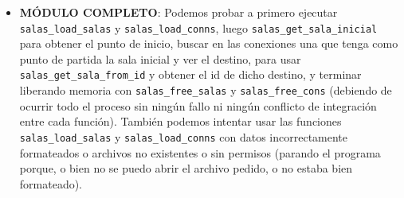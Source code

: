 \begin{itemize}
\begin{itemize}
			\\ \item \textbf{MÓDULO COMPLETO}: Podemos probar a primero ejecutar \verb|salas_load_salas| y \verb|salas_load_conns|, luego \verb|salas_get_sala_inicial| para obtener el punto de inicio, buscar en las conexiones una que tenga como punto de partida la sala inicial y ver el destino, para usar \verb|salas_get_sala_from_id| y obtener el id de dicho destino, y terminar liberando memoria con \verb|salas_free_salas| y \verb|salas_free_cons| (debiendo de ocurrir todo el proceso sin ningún fallo ni ningún conflicto de integración entre cada función). También podemos intentar usar las funciones \verb|salas_load_salas| y \verb|salas_load_conns| con datos incorrectamente formateados o archivos no existentes o sin permisos (parando el programa porque, o bien no se puedo abrir el archivo pedido, o no estaba bien formateado).
			
		\end{itemize}


\end{itemize}
